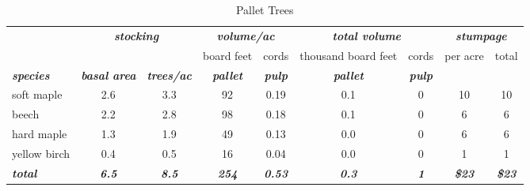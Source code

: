 \documentclass[landscape]{article}
\begin{document}
\begin{table}[H]

\caption{\label{tab:unnamed-chunk-41}Pallet Trees}
\fontsize{10}{12}\selectfont
\begin{tabular}[t]{lcccccccc}
\toprule
\multicolumn{1}{c}{\em{\textbf{ }}} & \multicolumn{2}{c}{\em{\textbf{stocking}}} & \multicolumn{2}{c}{\em{\textbf{volume/ac }}} & \multicolumn{2}{c}{\em{\textbf{total volume}}} & \multicolumn{2}{c}{\em{\textbf{stumpage}}} \\
\cmidrule(l{3pt}r{3pt}){2-3} \cmidrule(l{3pt}r{3pt}){4-5} \cmidrule(l{3pt}r{3pt}){6-7} \cmidrule(l{3pt}r{3pt}){8-9}
\multicolumn{3}{c}{ } & \multicolumn{1}{c}{board feet} & \multicolumn{1}{c}{cords} & \multicolumn{1}{c}{thousand board feet} & \multicolumn{1}{c}{cords} & \multicolumn{1}{c}{per acre} & \multicolumn{1}{c}{total} \\
\cmidrule(l{3pt}r{3pt}){4-4} \cmidrule(l{3pt}r{3pt}){5-5} \cmidrule(l{3pt}r{3pt}){6-6} \cmidrule(l{3pt}r{3pt}){7-7} \cmidrule(l{3pt}r{3pt}){8-8} \cmidrule(l{3pt}r{3pt}){9-9}
\rowcolor[HTML]{DCDCDC}  \em{\textbf{species}} & \em{\textbf{basal area}} & \em{\textbf{trees/ac}} & \em{\textbf{pallet}} & \em{\textbf{pulp}} & \em{\textbf{pallet}} & \em{\textbf{pulp}} & \em{\textbf{ }} & \em{\textbf{ }}\\
\midrule
\rowcolor{gray!6}  soft maple & 2.6 & 3.3 & 92 & 0.19 & 0.1 & 0 & 10 & 10\\
 
beech & 2.2 & 2.8 & 98 & 0.18 & 0.1 & 0 & 6 & 6\\
 
\rowcolor{gray!6}  hard maple & 1.3 & 1.9 & 49 & 0.13 & 0.0 & 0 & 6 & 6\\
 
yellow birch & 0.4 & 0.5 & 16 & 0.04 & 0.0 & 0 & 1 & 1\\
 
\rowcolor{gray!6}  \rowcolor[HTML]{DCDCDC}  \em{\textbf{total}} & \em{\textbf{6.5}} & \em{\textbf{8.5}} & \em{\textbf{254}} & \em{\textbf{0.53}} & \em{\textbf{0.3}} & \em{\textbf{1}} & \em{\textbf{\$23}} & \em{\textbf{\$23}}\\
\bottomrule
\end{tabular}
\end{table}
\end{document}
